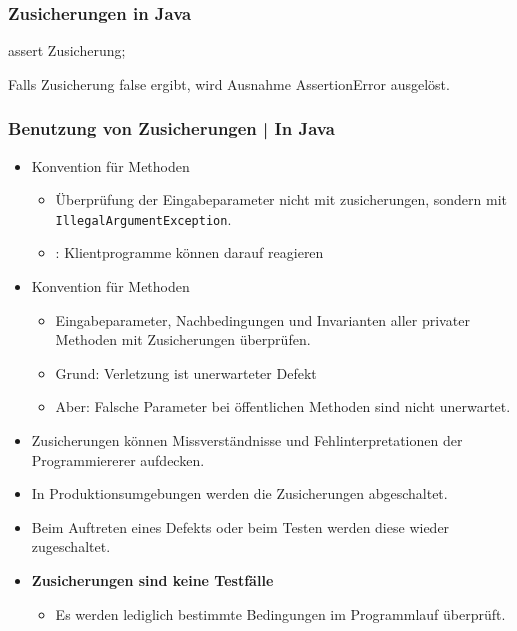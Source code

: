 \subsubsection{Zusicherungen in Java}
\begin{code}
    assert Zusicherung;
\end{code}

Falls Zusicherung false ergibt, wird Ausnahme AssertionError ausgelöst.

\subsubsection{Benutzung von Zusicherungen | In Java}
\begin{itemize}
    \item Konvention für  Methoden
\begin{itemize}
    \item Überprüfung der Eingabeparameter nicht mit zusicherungen, sondern mit \texttt{IllegalArgumentException}.
    \item {}: Klientprogramme können darauf reagieren
\end{itemize}
\item Konvention für  Methoden
\begin{itemize}
    \item Eingabeparameter, Nachbedingungen und Invarianten aller privater Methoden mit Zusicherungen überprüfen.
    \item Grund: Verletzung ist unerwarteter Defekt
    \item Aber: Falsche Parameter bei öffentlichen Methoden sind nicht unerwartet.
\end{itemize}
\item Zusicherungen können Missverständnisse und Fehlinterpretationen der Programmiererer aufdecken.
\item In Produktionsumgebungen werden die Zusicherungen abgeschaltet.
\item Beim Auftreten eines Defekts oder beim Testen werden diese wieder zugeschaltet.
\item \textbf{Zusicherungen sind keine Testfälle}
\begin{itemize}
    \item Es werden lediglich bestimmte Bedingungen im Programmlauf überprüft.
\end{itemize}
\end{itemize}

